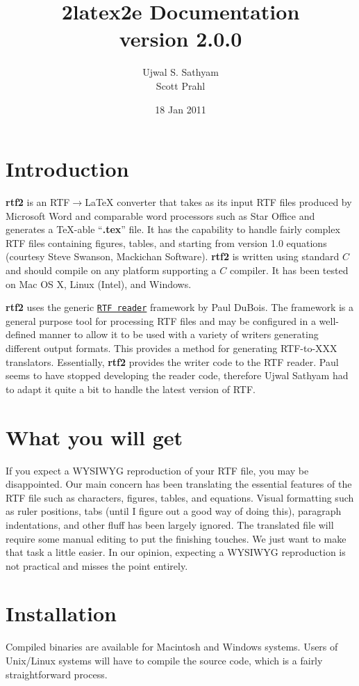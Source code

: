 \documentclass[11pt]{article}
\title{\rtf2latex2e Documentation\\
version 2.0.0}
\author{Ujwal S. Sathyam\\ Scott Prahl}
\date{18 Jan 2011}
\def\rtf2latex2e{{\bf rtf2\LaTeXe}}
\def\urltwo#1#2{\mbox{\href{#1}{\tt #2}}}
\begin{document}
 \maketitle


\section{Introduction 
\label{intro}} \rtf2latex2e is an RTF$\rightarrow${\LaTeX}
converter that takes as its input RTF files produced by Microsoft Word
and comparable word processors such as Star Office and generates a
\TeX-able ``{\bf .tex}'' file.  It has the capability to handle fairly
complex RTF files containing figures, tables, and starting from
version 1.0 equations (courtesy Steve Swanson, Mackichan
Software).  \rtf2latex2e is written using standard $C$ and
should compile on any platform supporting a $C$ compiler.  It has
been tested on Mac OS X, Linux (Intel), and Windows.

\rtf2latex2e uses the generic
\urltwo{http://www.primate.wisc.edu/software/RTF/}{RTF reader}
framework by Paul DuBois.  The framework is a general purpose tool for
processing RTF files and may be configured in a well-defined manner to
allow it to be used with a variety of writers generating different
output formats.  This provides a method for generating RTF-to-XXX
translators.  Essentially, \rtf2latex2e provides the {\LaTeXe} writer
code to the RTF reader.  Paul seems to have stopped developing the
reader code, therefore Ujwal Sathyam had to adapt it quite a bit to handle the
latest version of RTF.

\section*{What you will get}
If you expect a WYSIWYG reproduction of your RTF file, you may be
disappointed.  Our main concern has been translating the essential
features of the RTF file such as characters, figures, tables, and
equations.  Visual formatting
such as ruler positions, tabs (until I figure out a good way of doing
this), paragraph indentations, and other fluff has been largely ignored.  
The translated {\LaTeXe} file will require some manual editing to put the
finishing touches.  We just want to make that task a little easier.  In
our opinion, expecting a WYSIWYG reproduction is not practical and
misses the point entirely.

\section{Installation}
Compiled binaries are available for Macintosh and Windows systems. 
Users of Unix/Linux systems will have to compile the source code,
which is a fairly straightforward process.
\end{document}
